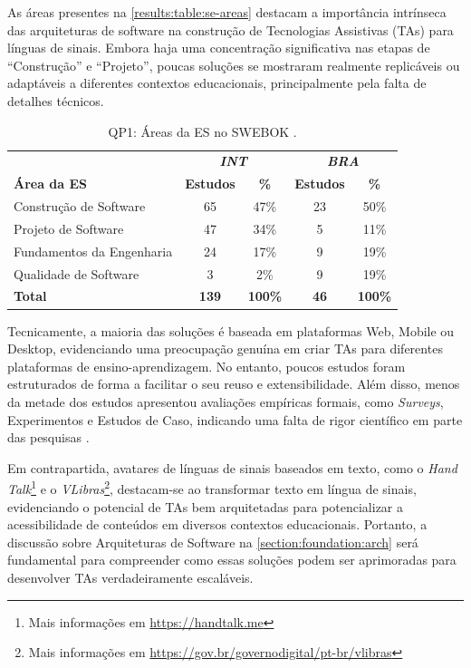 As áreas presentes na \autoref{results:table:se-areas} destacam a importância intrínseca das arquiteturas de software na construção de Tecnologias Assistivas (TAs) para línguas de sinais. Embora haja uma concentração significativa nas etapas de ``Construção'' e ``Projeto'', poucas soluções se mostraram realmente replicáveis ou adaptáveis a diferentes contextos educacionais, principalmente pela falta de detalhes técnicos.

\begin{table}[htb]
\caption{QP1: Áreas da ES no SWEBOK \cite{Bourque2014}.}
\label{results:table:se-areas}
\centering
\begin{tabular}{l|cc|cc} \hline
 & \multicolumn{2}{c|}{\textit{\textbf{INT}}} & \multicolumn{2}{c}{\textit{\textbf{BRA}}} \\ \cline{2-5} 
\textbf{Área da ES} & \textbf{Estudos} & \textbf{\%} & \textbf{Estudos} & \textbf{\%} \\ \hline
Construção de Software & 65 & 47\% & 23 & 50\% \\
Projeto de Software & 47 & 34\% & 5 & 11\% \\
Fundamentos da Engenharia & 24 & 17\% & 9 & 19\% \\
Qualidade de Software & 3 & 2\% & 9 & 19\% \\ \hline
\textbf{Total} & \textbf{139} & \textbf{100\%} & \textbf{46} & \textbf{100\%} \\ \hline
\end{tabular}
\end{table}

Tecnicamente, a maioria das soluções é baseada em plataformas Web, Mobile ou Desktop, evidenciando uma preocupação genuína em criar TAs para diferentes plataformas de ensino-aprendizagem. No entanto, poucos estudos foram estruturados de forma a facilitar o seu reuso e extensibilidade. Além disso, menos da metade dos estudos apresentou avaliações empíricas formais, como \textit{Surveys}, Experimentos e Estudos de Caso, indicando uma falta de rigor científico em parte das pesquisas \cite{Pressman2016, Sommerville2015}.

Em contrapartida, avatares de línguas de sinais baseados em texto, como o \textit{Hand Talk}\footnote{Mais informações em \url{https://handtalk.me}} e o \textit{VLibras}\footnote{Mais informações em \url{https://gov.br/governodigital/pt-br/vlibras}}, destacam-se ao transformar texto em língua de sinais, evidenciando o potencial de TAs bem arquitetadas para potencializar a acessibilidade de conteúdos em diversos contextos educacionais. Portanto, a discussão sobre Arquiteturas de Software na \autoref{section:foundation:arch} será fundamental para compreender como essas soluções podem ser aprimoradas para desenvolver TAs verdadeiramente escaláveis.

